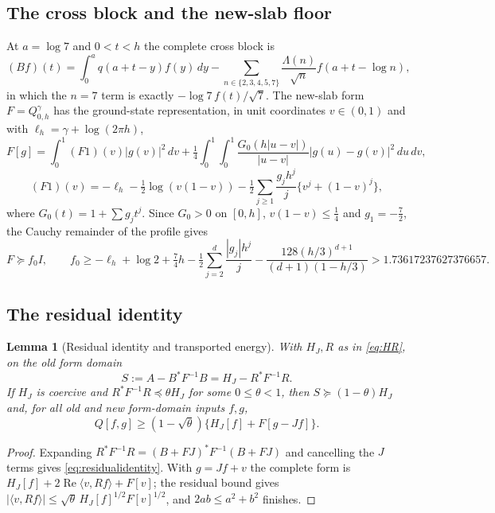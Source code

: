 \documentclass[11pt]{article}
\numberwithin{equation}{section}
\newtheorem{lemma}[theorem]{Lemma}
\theoremstyle{definition}
\theoremstyle{remark}
\newcommand{\Rea}{\operatorname{Re}}
\newcommand{\ip}[2]{\langle#1,#2\rangle}
\begin{document}
\subsection{The cross block and the new-slab floor}
At $a=\log7$ and $0<t<h$ the complete cross block is
\begin{equation}\label{eq:B}
 (Bf)(t)=\int_0^a q(a+t-y)f(y)\,dy-\sum_{n\in\{2,3,4,5,7\}}\frac{\Lambda(n)}{\sqrt n}f(a+t-\log n),
\end{equation}
in which the $n=7$ term is exactly $-\log7\,f(t)/\sqrt7$. The new-slab form $F=Q^\gamma_{0,h}$ has the ground-state representation, in unit coordinates $v\in(0,1)$ and with $\ell_h=\gamma+\log(2\pi h)$,
\[
 F[g]=\int_0^1(F1)(v)|g(v)|^2\,dv+\tfrac14\int_0^1\!\!\int_0^1\frac{G_0(h|u-v|)}{|u-v|}|g(u)-g(v)|^2\,du\,dv,
\]
\[
 (F1)(v)=-\ell_h-\tfrac12\log(v(1-v))-\tfrac12\sum_{j\ge1}\frac{g_jh^j}{j}\{v^j+(1-v)^j\},
\]
where $G_0(t)=1+\sum g_jt^j$. Since $G_0>0$ on $[0,h]$, $v(1-v)\le\tfrac14$ and $g_1=-\tfrac72$, the Cauchy remainder of the profile gives
\begin{equation}\label{eq:f0}
 F\succeq f_0I,\qquad f_0\ge-\ell_h+\log2+\tfrac74h-\tfrac12\sum_{j=2}^d\frac{|g_j|h^j}{j}-\frac{128(h/3)^{d+1}}{(d+1)(1-h/3)}>1.73617237627376657 .
\end{equation}

\subsection{The residual identity}
\begin{lemma}[Residual identity and transported energy]\label{lem:residual}
With $H_J,R$ as in \eqref{eq:HR}, on the old form domain
\begin{equation}\label{eq:residualidentity}
 S:=A-B^*F^{-1}B=H_J-R^*F^{-1}R .
\end{equation}
If $H_J$ is coercive and $R^*F^{-1}R\preceq\theta H_J$ for some $0\le\theta<1$, then $S\succeq(1-\theta)H_J$ and, for all old and new form-domain inputs $f,g$,
\[
 Q[f,g]\ge(1-\sqrt\theta)\{H_J[f]+F[g-Jf]\}.
\]
\end{lemma}
\begin{proof}
Expanding $R^*F^{-1}R=(B+FJ)^*F^{-1}(B+FJ)$ and cancelling the $J$ terms gives \eqref{eq:residualidentity}. With $g=Jf+v$ the complete form is $H_J[f]+2\Rea\ip v{Rf}+F[v]$; the residual bound gives $|\ip v{Rf}|\le\sqrt\theta\,H_J[f]^{1/2}F[v]^{1/2}$, and $2ab\le a^2+b^2$ finishes.
\end{proof}
\end{document}
